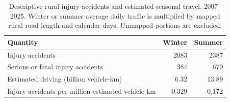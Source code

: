 \begin{table}[htbp]
\centering
\small
\caption[Rural winter and summer counts and estimated travel.]{Descriptive rural injury accidents and estimated seasonal travel, 2007--2025. Winter or summer average daily traffic is multiplied by mapped rural road length and calendar days. Unmapped portions are excluded.}
\label{tab:rural-seasonal-rates}
\begin{tabular}{lrr}
\toprule
Quantity & Winter & Summer \\
\midrule
Injury accidents & 2083 & 2387 \\ \grayhline
Serious or fatal injury accidents & 384 & 670 \\ \grayhline
Estimated driving (billion vehicle-km) & 6.32 & 13.89 \\ \grayhline
Injury accidents per million estimated vehicle-km & 0.329 & 0.172 \\
\bottomrule
\end{tabular}
\end{table}

